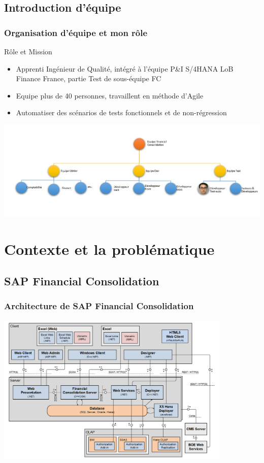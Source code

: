 \documentclass{beamer}
\begin{document}
        \subsection{Introduction d'équipe}
        \begin{frame}
        \frametitle{Organisation d'équipe et mon rôle}
            \begin{block}{Rôle et Mission}
            \begin{itemize}
                \item Apprenti Ingénieur de Qualité, intégré à l'équipe P\&I S/4HANA LoB Finance France, partie Test de sous-équipe FC
                \item Equipe plus de 40 personnes, travaillent en méthode d'Agile
                \item Automatiser des scénarios de tests fonctionnels et de non-régression
            \end{itemize}
            
            \end{block}
            \includegraphics[width=\textwidth]{role_organisation.jpg}
        \end{frame}
        
    \section{Contexte et la problématique}
        \subsection{SAP Financial Consolidation}
        \begin{frame}
            \frametitle{Architecture de SAP Financial Consolidation}
            \includegraphics[width=0.84\textwidth]{FC_Globale_Architecture.png}
        \end{frame}
        
\end{document}
